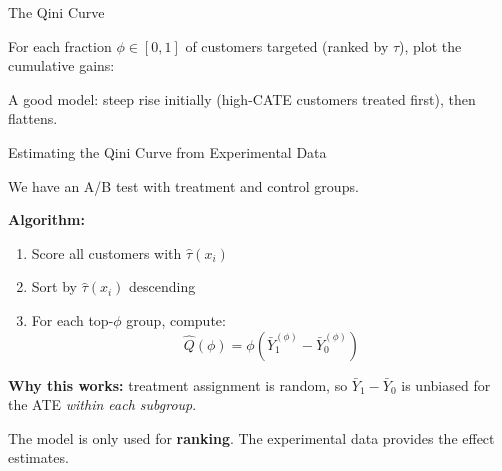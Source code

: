\documentclass[aspectratio=169, 11pt]{beamer}
\begin{document}
\begin{frame}{The Qini Curve}
 
For each fraction $\phi \in [0, 1]$ of customers targeted (ranked by $\hat{\tau}$), plot the cumulative gains:
 
\begin{center}
\end{center}
 
A good model: steep rise initially (high-CATE customers treated first), then flattens.
\end{frame}
 
\begin{frame}{Estimating the Qini Curve from Experimental Data}
 
We have an A/B test with treatment and control groups.
 
\bigskip
 
\textbf{Algorithm:}
\begin{enumerate}
    \item Score all customers with $\hat{\tau}(x_i)$
    \item Sort by $\hat{\tau}(x_i)$ descending
    \item For each top-$\phi$ group, compute:
    \[
    \hat{Q}(\phi) = \phi \left(\bar{Y}_1^{(\phi)} - \bar{Y}_0^{(\phi)}\right)
    \]
\end{enumerate}
 
\bigskip
 
\textbf{Why this works:} treatment assignment is random, so $\bar{Y}_1 - \bar{Y}_0$ is unbiased for the ATE \emph{within each subgroup}.
 
\bigskip
 
The model is only used for \textbf{ranking}. The experimental data provides the effect estimates.
\end{frame}
 
\end{document}
